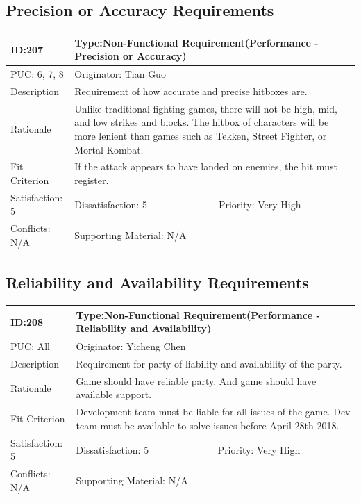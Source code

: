 \documentclass{article}
\begin{document}
\subsection{Precision or Accuracy Requirements}
\begin{table}[H]
    \begin{tabular}{|l|l|l|}
    \hline
    ID:207 & \multicolumn{2}{l|}{Type:Non-Functional Requirement(Performance - Precision or Accuracy)} \\ \hline
    PUC: 6, 7, 8 & \multicolumn{2}{l|}{Originator: Tian Guo} \\ \hline
    Description & \multicolumn{2}{m{0.85\textwidth}|}{Requirement of how accurate and precise hitboxes are.} \\ \hline
    Rationale & \multicolumn{2}{m{0.85\textwidth}|}{Unlike traditional fighting games, there will not be high, mid, and low strikes and blocks. The hitbox of characters will be more lenient than games such as Tekken, Street Fighter, or Mortal Kombat.} \\ \hline
    Fit Criterion & \multicolumn{2}{m{0.85\textwidth}|}{If the attack appears to have landed on enemies, the hit must register.} \\ \hline
    Satisfaction: 5 & Dissatisfaction: 5 & Priority: Very High \\ \hline
    Conflicts: N/A & \multicolumn{2}{l|}{Supporting Material: N/A} \\ \hline
    \end{tabular}
    \end{table}

\subsection{Reliability and Availability Requirements}
\begin{table}[H]
    \begin{tabular}{|l|l|l|}
    \hline
    ID:208 & \multicolumn{2}{l|}{Type:Non-Functional Requirement(Performance - Reliability and Availability)} \\ \hline
    PUC: All & \multicolumn{2}{l|}{Originator: Yicheng Chen} \\ \hline
    Description & \multicolumn{2}{m{0.85\textwidth}|}{Requirement for party of liability and availability of the party.} \\ \hline
    Rationale & \multicolumn{2}{m{0.85\textwidth}|}{Game should have reliable party. And game should have available support.} \\ \hline
    Fit Criterion & \multicolumn{2}{m{0.85\textwidth}|}{Development team must be liable for all issues of the game. Dev team must be available to solve issues before April 28th 2018.} \\ \hline
    Satisfaction: 5 & Dissatisfaction: 5 & Priority: Very High \\ \hline
    Conflicts: N/A & \multicolumn{2}{l|}{Supporting Material: N/A} \\ \hline
    \end{tabular}
    \end{table}
    
\end{document}
